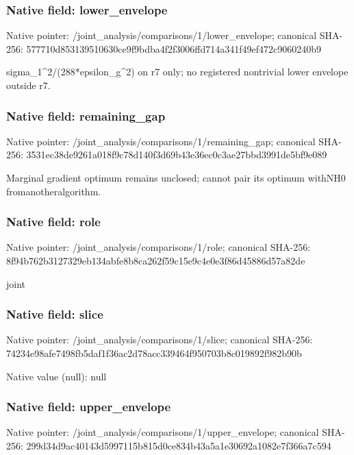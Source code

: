\documentclass[10pt,a4paper]{article}
\begin{document}
\subsubsection{Native field: lower\_\allowbreak{}envelope}
Native pointer: /joint\_\allowbreak{}analysis/comparisons/1/lower\_\allowbreak{}envelope; canonical SHA-256: 577710d853139510630ce9f9bdba4f2f3006ffd714a341f49ef472c9060240b9

\begingroup\raggedright\sloppy sigma\_\allowbreak{}1\textasciicircum{}2/\allowbreak{}(288*epsilon\_\allowbreak{}g\textasciicircum{}2) on r7 only;\allowbreak{} no registered nontrivial lower envelope outside r7.\par\endgroup

\subsubsection{Native field: remaining\_\allowbreak{}gap}
Native pointer: /joint\_\allowbreak{}analysis/comparisons/1/remaining\_\allowbreak{}gap; canonical SHA-256: 3531ec38de9261a018f9c78d140f3d69b43e36ec0c3ae27bbd3991de5bf9e089

\begingroup\raggedright\sloppy Marginal gradient optimum remains unclosed;\allowbreak{} cannot pair its optimum withNH0 fromanotheralgorithm.\par\endgroup

\subsubsection{Native field: role}
Native pointer: /joint\_\allowbreak{}analysis/comparisons/1/role; canonical SHA-256: 8f94b762b3127329eb134abfe8b8ca262f59c15e9c4e0e3f86d45886d57a82de

\begingroup\raggedright\sloppy joint\par\endgroup

\subsubsection{Native field: slice}
Native pointer: /joint\_\allowbreak{}analysis/comparisons/1/slice; canonical SHA-256: 74234e98afe7498fb5daf1f36ac2d78acc339464f950703b8c019892f982b90b

Native value (null): null

\subsubsection{Native field: upper\_\allowbreak{}envelope}
Native pointer: /joint\_\allowbreak{}analysis/comparisons/1/upper\_\allowbreak{}envelope; canonical SHA-256: 299d34d9ac40143d5997115b815d0ce834b43a5a1e30692a1082e7f366a7c594
\end{document}
